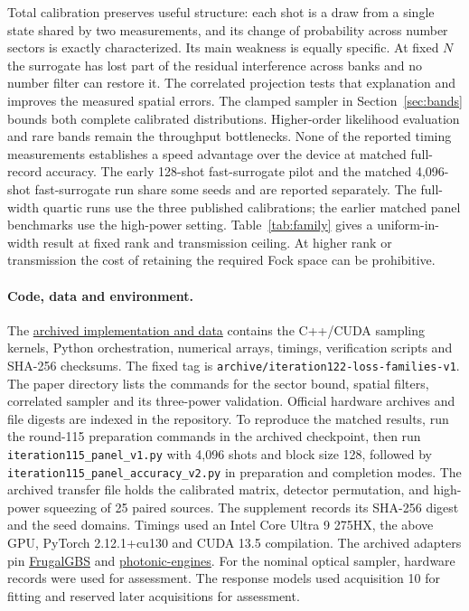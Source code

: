 \documentclass[11pt]{article}
\newcommand{\resource}{\href{https://github.com/qiyuanhuakai/deziroGBS/tree/archive/iteration122-loss-families-v1}{archived implementation and data}}
\begin{document}
Total calibration preserves useful structure: each shot is a draw from a single state shared by two measurements, and its change of probability across number sectors is exactly characterized. Its main weakness is equally specific. At fixed $N$ the surrogate has lost part of the residual interference across banks and no number filter can restore it. The correlated projection tests that explanation and improves the measured spatial errors. The clamped sampler in Section~\ref{sec:bands} bounds both complete calibrated distributions. Higher-order likelihood evaluation and rare bands remain the throughput bottlenecks. None of the reported timing measurements establishes a speed advantage over the device at matched full-record accuracy. The early 128-shot fast-surrogate pilot and the matched 4,096-shot fast-surrogate run share some seeds and are reported separately. The full-width quartic runs use the three published calibrations; the earlier matched panel benchmarks use the high-power setting. Table~\ref{tab:family} gives a uniform-in-width result at fixed rank and transmission ceiling. At higher rank or transmission the cost of retaining the required Fock space can be prohibitive.

\paragraph{Code, data and environment.}
The \resource{} contains the C++/CUDA sampling kernels, Python orchestration, numerical arrays, timings, verification scripts and SHA-256 checksums. The fixed tag is \texttt{archive/iteration122-loss-families-v1}. The paper directory lists the commands for the sector bound, spatial filters, correlated sampler and its three-power validation. Official hardware archives and file digests are indexed in the repository. To reproduce the matched results, run the round-115 preparation commands in the archived checkpoint, then run
\texttt{iteration115\_panel\_v1.py} with 4,096 shots and block size 128, followed by \texttt{iteration115\_panel\_accuracy\_v2.py} in preparation and completion modes. The archived transfer file holds the calibrated matrix, detector permutation, and high-power squeezing of 25 paired sources. The supplement records its SHA-256 digest and the seed domains. Timings used an Intel Core Ultra 9 275HX, the above GPU, PyTorch 2.12.1+cu130 and CUDA 13.5 compilation. The archived adapters pin \href{https://github.com/tomdodd4598/FrugalGBS/tree/fa8b796f2afebd4845a2e335e457735952617ef8}{FrugalGBS} and \href{https://github.com/Quandela/photonic-engines/tree/6c1ed6f8f11ffc9f3c268757f0fe0bd48a768d82}{photonic-engines}. For the nominal optical sampler, hardware records were used for assessment. The response models used acquisition 10 for fitting and reserved later acquisitions for assessment.
\end{document}
